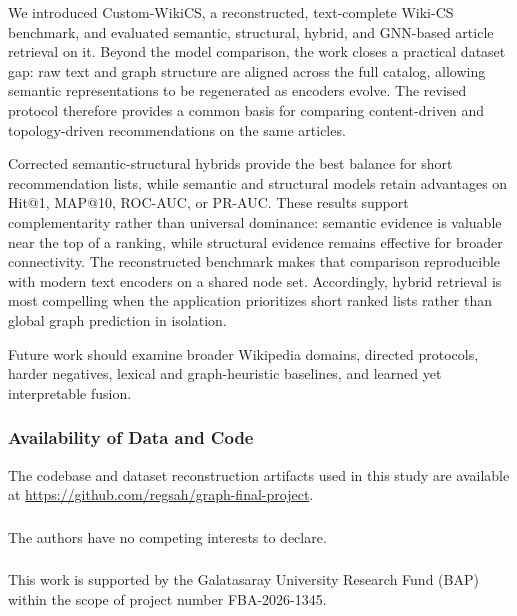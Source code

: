 \documentclass[runningheads]{llncs}
\begin{document}
We introduced Custom-WikiCS, a reconstructed, text-complete Wiki-CS benchmark,
and evaluated semantic, structural, hybrid, and GNN-based article retrieval on
it. Beyond the model comparison, the work closes a practical dataset gap: raw
text and graph structure are aligned across the full catalog, allowing semantic
representations to be regenerated as encoders evolve. The revised protocol
therefore provides a common basis for comparing content-driven and
topology-driven recommendations on the same articles.

Corrected semantic-structural hybrids provide the best balance for short
recommendation lists, while semantic and structural models retain advantages on
Hit@1, MAP@10, ROC-AUC, or PR-AUC. These results support complementarity rather
than universal dominance: semantic evidence is valuable near the top of a
ranking, while structural evidence remains effective for broader connectivity.
The reconstructed benchmark makes that comparison reproducible with modern text
encoders on a shared node set. Accordingly, hybrid retrieval is most compelling
when the application prioritizes short ranked lists rather than global graph
prediction in isolation.

Future work should examine broader Wikipedia domains, directed protocols,
harder negatives, lexical and graph-heuristic baselines, and learned yet
interpretable fusion.

\begin{credits}
\subsubsection{Availability of Data and Code}
The codebase and dataset reconstruction artifacts used in this study are
available at\newline
\url{https://github.com/regsah/graph-final-project}.

\subsubsection{\discintname}
The authors have no competing interests to declare.

\subsubsection{\ackname}
This work is supported by the Galatasaray University Research Fund (BAP) within
the scope of project number FBA-2026-1345.
 
\end{credits}



\end{document}
